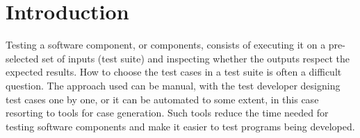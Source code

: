 
\section{Introduction}
\label{sec:intro}



Testing a software component, or components, consists of executing it on
a pre-selected set of inputs (test suite) and inspecting whether the outputs
respect the expected results.
%
%
How to choose the test cases in a test suite is often a difficult
question.
%
The approach used
can be  manual, with the test developer designing test cases one by
one, or it can be automated to some extent, in this case resorting to
tools for case generation.
%
Such tools reduce the time needed for testing software components and make
it easier to test programs being developed.


